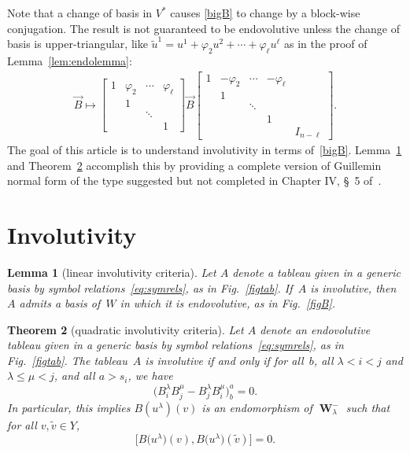 \documentclass[pdftex]{sigma}
\numberwithin{equation}{section}
\newtheorem{Theorem}{Theorem}[section]
\newtheorem{Lemma}[Theorem]{Lemma}
{\theoremstyle{definition}
\newtheorem{Definition}[Theorem]{Definition} }
\DeclareMathOperator{\Wu}{\mathbf{W}}
\begin{document}
Note that a change of basis in $V^*$ causes \eqref{bigB} to change by a block-wise
conjugation. The result is not guaranteed to be endovolutive unless the change of basis
is upper-triangular, like $\tilde{u}^1 = u^1 + \varphi_2 u^2 +  \cdots + \varphi_\ell u^\ell$ as in the proof of
Lemma~\ref{lem:endolemma}:
\begin{gather*}
\vec{B} \mapsto \begin{bmatrix}
1 & \varphi_2  & \cdots & \varphi_\ell \\
  & 1          &        &              \\
  &            & \ddots &              \\
  &            &        & 1
\end{bmatrix}
\vec{B}
\begin{bmatrix}
1 &-\varphi_2  & \cdots &-\varphi_\ell &     \\
  & 1          &        &              &  \\
  &            & \ddots &              &  \\
  &            &        & 1            &  \\
  &            &        &              &I_{n-\ell}
\end{bmatrix}.
\label{bigBtr}
\end{gather*}
The goal of this article is to understand involutivity in terms of~\eqref{bigB}.  Lemma~\ref{lem:invend} and Theorem~\ref{thm:gnf+}
accomplish this by providing a complete
version of Guillemin normal form of the type suggested but not completed in
Chapter IV, \S~5 of~\cite{BCGGG}.


\section{Involutivity}

\begin{Lemma}[linear involutivity criteria]\label{lem:invend}
Let $A$ denote a tableau given in a generic basis by
symbol relations~\eqref{eq:symrels}, as in Fig.~{\rm \ref{figtab}}.
If~$A$ is involutive, then~$A$ admits a basis of~$W$ in which it is
endovolutive, as in Fig.~{\rm \ref{figB}}.
\end{Lemma}

\begin{Theorem}[quadratic involutivity criteria]\label{thm:gnf+}
Let $A$ denote an endovolutive tableau given in a generic basis by
symbol relations~\eqref{eq:symrels}, as in Fig.~{\rm \ref{figtab}}.
The tableau~$A$ is involutive if and only if
for all~$b$, all $\lambda < i < j$ and $\lambda \leq \mu < j$, and all $a> s_i$, we have
\[\big(B^\lambda_iB^\mu_j - B^\lambda_jB^\mu_i\big)^a_b=0.\]
In particular, this implies $B(u^\lambda)(v)$ is an endomorphism of $\Wu^-_\lambda$ such
that
for all $v, \tilde{v} \in Y$,
\[
\big[B\big(u^\lambda\big)(v), B\big(u^\lambda\big)(\tilde{v})\big]=0.
\]
\end{Theorem}
\end{document}
